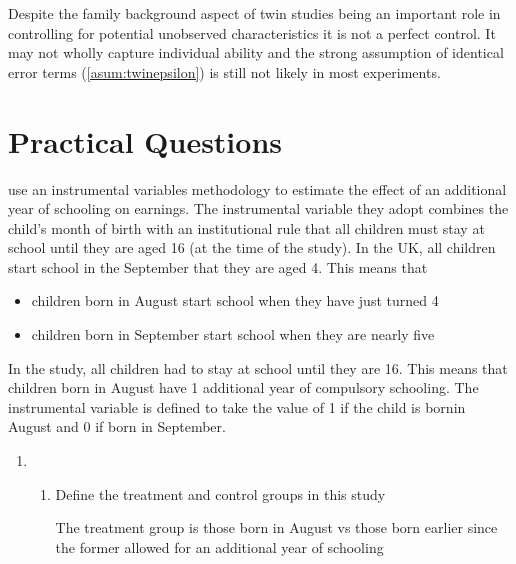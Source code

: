 \documentclass[../Main.tex]{subfiles}
\begin{document}
\begin{refsection}
Despite the family background aspect of twin studies being an important role in
controlling for potential unobserved characteristics it is not a perfect
control. It may not wholly capture individual ability and the strong assumption
of identical error terms (\ref{asum:twinepsilon}) is still not likely in most
experiments. 

\section{Practical Questions} 

\textcite{angrist_does_1991} use an instrumental variables methodology to
estimate the effect of an additional year of schooling on earnings. The
instrumental variable they adopt combines the child’s month of birth with an
institutional rule that all children must stay at school until they are aged 16
(at the time of the study). In the UK, all children start school in the
September that they are aged 4. This means that 

\begin{itemize} 

\item children born in August start school when they have just turned 4 

\item children born in September start school when they are nearly five 

\end{itemize} 

In the study, all children had to stay at school until they are 16. This means
that children born in August have 1 additional year of compulsory schooling. The
instrumental variable is defined to take the value of 1 if the child is bornin
August and 0 if born in September.

\begin{enumerate}

    \item \begin{enumerate}
    
        \item Define the treatment and control groups in this study

        \begin{answer}
        
            The treatment group is those born in August vs those born
            earlier since the former allowed for an additional year of
            schooling

        \end{answer}
        

\end{enumerate}
\end{enumerate}
\end{refsection}
\end{document}
